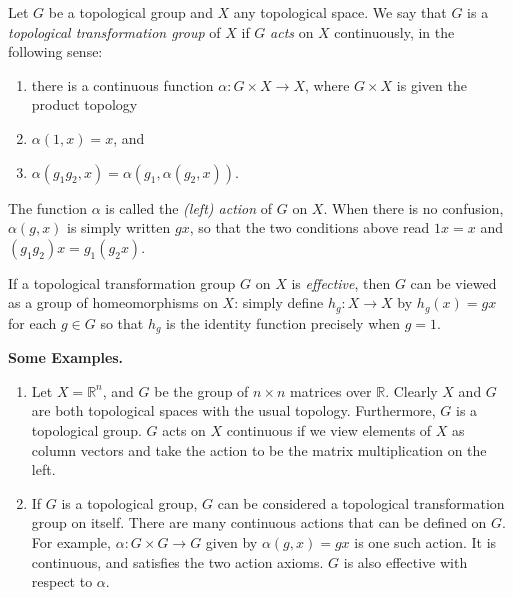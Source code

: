 \documentclass[12pt]{article}
\begin{document}
Let $G$ be a topological group and $X$ any topological space.  We say that $G$ is a \emph{topological transformation group} of $X$ if $G$ \emph{acts} on $X$ continuously, in the following sense:
\begin{enumerate}
\item there is a continuous function $\alpha:G\times X\to X$, where $G\times X$ is given the product topology
\item $\alpha(1,x)=x$, and
\item $\alpha(g_1g_2,x)=\alpha(g_1,\alpha(g_2,x))$.
\end{enumerate}

The function $\alpha$ is called the \emph{(left) action} of $G$ on $X$.  When there is no confusion, $\alpha(g,x)$ is simply written $gx$, so that the two conditions above read $1x=x$ and $(g_1g_2)x=g_1(g_2x)$.

If a topological transformation group $G$ on $X$ is \emph{effective}, then $G$ can be viewed as a group of homeomorphisms on $X$: simply define $h_g:X\to X$ by $h_g(x)=gx$ for each $g\in G$ so that $h_g$ is the identity function precisely when $g=1$.

\textbf{Some Examples.}
\begin{enumerate}
\item
Let $X=\mathbb{R}^n$, and $G$ be the group of $n\times n$ matrices over $\mathbb{R}$.  Clearly $X$ and $G$ are both topological spaces with the usual topology.  Furthermore, $G$ is a topological group.  $G$ acts on $X$ continuous if we view elements of $X$ as column vectors and take the action to be the matrix multiplication on the left.
\item
If $G$ is a topological group, $G$ can be considered a topological transformation group on itself.  There are many continuous actions that can be defined on $G$.  For example, $\alpha:G\times G\to G$ given by $\alpha(g,x)=gx$ is one such action.  It is continuous, and satisfies the two action axioms.  $G$ is also effective with respect to $\alpha$.
\end{enumerate}
\end{document}
